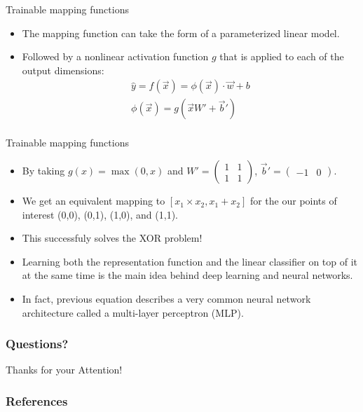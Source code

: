\documentclass[handout]{beamer}
\begin{document}
\begin{frame}{Trainable mapping functions}
\begin{scriptsize}
\begin{itemize}
\item The mapping function can take the form of a parameterized linear model.
\item Followed by a nonlinear activation function $g$ that is applied to each of the output dimensions:
\begin{equation}
\begin{split}
\hat{y} = f(\vec{x}) = \phi(\vec{x}) \cdot \vec{w} +b \\
\phi(\vec{x}) = g(\vec{x}W'+ \vec{b}') \\
\end{split} 
\end{equation}
\end{itemize}
\end{scriptsize}
\end{frame}



\begin{frame}{Trainable mapping functions}
\begin{scriptsize}
\begin{itemize}
\item By taking $g(x) = \operatorname{max}(0, x)$ and $W' = \begin{pmatrix}
    1 & 1 \\ 1 & 1 \end{pmatrix}$, $\vec{b}' = \begin{pmatrix}
    -1 & 0 \end{pmatrix}$.
\item We get an equivalent mapping to $[x_1 \times x_2, x_1 + x_2]$  for the our points of interest (0,0), (0,1), (1,0), and (1,1).
\item This successfuly solves the XOR problem!
\item Learning both the representation function and the linear classifier on top of it at the same time is the main idea behind deep learning and neural networks.
\item In fact, previous equation describes a very common neural network architecture called a multi-layer perceptron (MLP).
\end{itemize}
\end{scriptsize}
\end{frame}




\begin{frame}
\frametitle{Questions?}
\begin{center}\LARGE Thanks for your Attention!\\ \end{center}



\end{frame}

\begin{frame}[allowframebreaks]\scriptsize
\frametitle{References}


%
\end{frame}  


\end{document}
